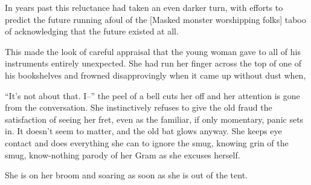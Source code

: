 \documentclass[../FGP.tex]{subfiles}
\begin{document}
\begin{fragment}In years past this reluctance had taken an even darker turn, with efforts to predict the future running afoul of the [Masked monster worshipping folks] taboo of acknowledging that the future existed at all. \end{fragment}

\begin{fragment}This made the look of careful appraisal that the young woman gave to all of his instruments entirely unexpected. She had run her finger across the top of one of his bookshelves and frowned disapprovingly when it came up without dust when, \end{fragment}

\begin{fragment}
``It's not about that. I--'' the peel of a bell cuts her off and her attention is gone from the conversation. She instinctively refuses to give the old fraud the satisfaction of seeing her fret, even as the familiar, if only momentary, panic sets in. It doesn't seem to matter, and the old bat glows anyway. She keeps eye contact and does everything she can to ignore the smug, knowing grin of the smug, know-nothing parody of her Gram as she excuses herself.   

She is on her broom and soaring as soon as she is out of the tent. 
\end{fragment}
\end{document}

